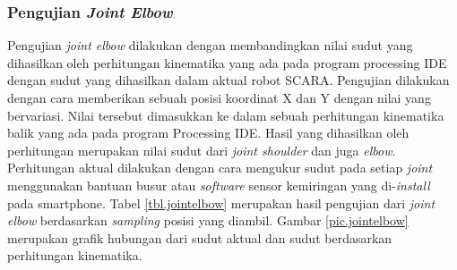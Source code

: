  \subsubsection{Pengujian \textit{Joint Elbow}}
 Pengujian \textit{joint elbow} dilakukan dengan membandingkan nilai sudut yang dihasilkan oleh perhitungan kinematika yang ada pada program processing IDE dengan sudut yang dihasilkan dalam aktual robot SCARA. Pengujian dilakukan dengan cara memberikan sebuah posisi koordinat X dan Y dengan nilai yang bervariasi. Nilai tersebut dimasukkan ke dalam sebuah perhitungan kinematika balik yang ada pada program Processing IDE. Hasil yang dihasilkan oleh perhitungan merupakan nilai sudut dari \textit{joint shoulder} dan juga \textit{elbow}. Perhitungan aktual dilakukan dengan cara mengukur sudut pada setiap \textit{joint} menggunakan bantuan busur atau \textit{software} sensor kemiringan yang di-\textit{install} pada smartphone. Tabel \ref{tbl.jointelbow} merupakan hasil pengujian dari \textit{joint elbow} berdasarkan \textit{sampling} posisi yang diambil. Gambar \ref{pic.jointelbow} merupakan grafik hubungan dari sudut aktual dan sudut berdasarkan perhitungan kinematika. 
 
